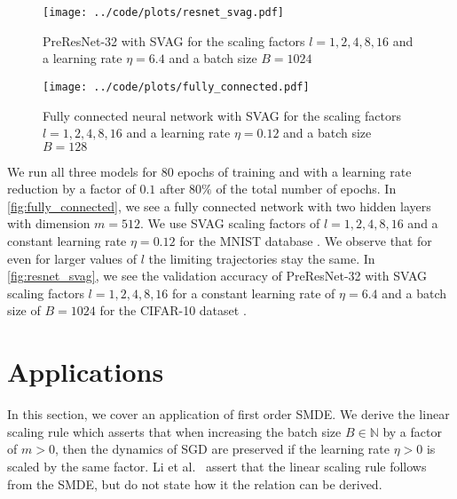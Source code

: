 \documentclass[12pt]{article}
\theoremstyle{definition}
\numberwithin{equation}{section}
\newcommand{\N}{\mathbb{N}}
\begin{document}
\begin{figure}[htb]
  \centering
  \texttt{[image: ../code/plots/resnet\_svag.pdf]}
  \caption{PreResNet-32 with SVAG for the scaling factors $l=1,2,4,8,16$ and a learning rate $\eta=6.4$ and a batch size $B=1024$}
  \label{fig:resnet_svag}
\end{figure}
\begin{figure}[htb]
  \centering
  \texttt{[image: ../code/plots/fully\_connected.pdf]}
  \caption{Fully connected neural network with SVAG for the scaling factors $l=1,2,4,8,16$ and a learning rate $\eta=0.12$ and a batch size $B=128$}
  \label{fig:fully_connected}
\end{figure}
We run all three models for 80 epochs of training and with a learning rate reduction by a factor of $0.1$ after $80\%$ of the total number of epochs. In \autoref{fig:fully_connected}, we see a fully connected network with two hidden layers with dimension $m=512$. We use SVAG scaling factors of $l=1,2,4,8,16$ and a constant learning rate $\eta = 0.12$ for the MNIST database \cite{dengMNISTDatabaseHandwritten2012}. We observe that for even for larger values of $l$ the limiting trajectories stay the same.
In \autoref{fig:resnet_svag}, we see the validation accuracy of PreResNet-32 with SVAG scaling factors $l=1,2,4,8,16$ for a constant learning rate of $\eta = 6.4$ and a batch size of $B =1024$ for the CIFAR-10 dataset \cite{krizhevskyLearningMultipleLayers2009}. 
\section{Applications}
\label{sec:applications}
In this section, we cover an application of first order SMDE. We derive the linear scaling rule \cite{goyalAccurateLargeMinibatch2018, krizhevskyOneWeirdTrick2014} which asserts that when increasing the batch size $B \in \N$ by a factor of $m > 0$, then the dynamics of SGD are preserved if the learning rate $\eta > 0$ is scaled by the same factor. Li et al.\ \cite{liValidityModelingSGD2021} assert that the linear scaling rule follows from the SMDE, but do not state how it the relation can be derived. 
\end{document}
